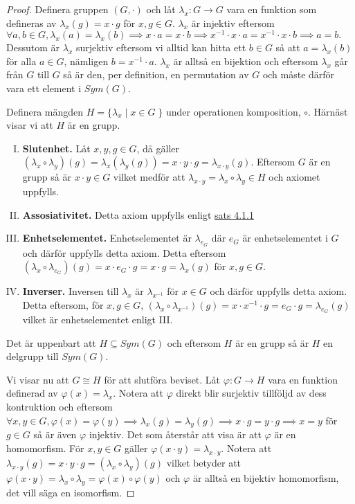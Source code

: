 \documentclass{article}
\theoremstyle{definition}
\begin{document}
\begin{proof}
  Definera gruppen $(G, \cdot)$ och låt $\lambda_x: G \rightarrow G$ vara en funktion som 
  defineras av $\lambda_x (g) = x \cdot g$ för $x, g \in G$. 
  $\lambda_x$ är injektiv eftersom $\forall a, b \in G, \lambda_x(a) = \lambda_x (b) \implies
  x \cdot a = x \cdot b \implies x^{-1} \cdot x \cdot a = x^{-1} \cdot x \cdot b \implies a = b.$
  Dessutom är $\lambda_x$ surjektiv eftersom vi alltid kan hitta ett $b \in G$ så att 
  $a = \lambda_x(b)$ för alla $a \in G$, nämligen $b = x^{-1} \cdot a.$
  $\lambda_x$ är alltså en bijektion och eftersom $\lambda_x$ går från $G$ till $G$ så är 
  den, per definition, en permutation av $G$ och måste därför vara ett element i $Sym(G)$. 

  Definera mängden $H = \{\lambda_x \; |\; x \in G\; \}$ under operationen komposition, $\circ$.
  Härnäst visar vi att $H$ är en grupp.
  \begin{enumerate}[I)]
    \item \textbf{Slutenhet.} Låt $x, y, g \in G$, då gäller
    $(\lambda_x \circ \lambda_y)(g) = \lambda_x(\lambda_y(g)) = x \cdot y \cdot g = 
    \lambda_{x \cdot y}(g).$ Eftersom $G$ är en grupp så är $x \cdot y \in G$ vilket medför 
    att $\lambda_{x \cdot y} = \lambda_x \circ \lambda_y \in H$ och axiomet uppfylls.
    \item \textbf{Assosiativitet.} Detta axiom uppfylls enligt \hyperlink{ass}{sats 4.1.1}
    \item \textbf{Enhetselementet.} Enhetselementet är $\lambda_{e_G}$ där $e_G$ är 
    enhetselementet i $G$ och därför 
    uppfylls detta axiom. Detta eftersom $(\lambda_x \circ \lambda_{e_G})(g) = x \cdot e_G \cdot g
    = x \cdot g = \lambda_x (g)$ för $x, g \in G.$
    \item \textbf{Inverser.} Inversen till $\lambda_x$ är $\lambda_{x^{-1}}$ för $x \in G$
    och därför uppfylls detta axiom. 
    Detta eftersom, för $x, g \in G$, $(\lambda_x \circ \lambda_{x^{-1}})(g) = x \cdot x^{-1} \cdot g = 
    e_G \cdot g = \lambda_{e_G} (g)$ vilket är enhetselementet enligt III.
  \end{enumerate}
  Det är uppenbart att $H \subseteq Sym(G)$ och eftersom $H$ är en grupp så är $H$ en delgrupp 
  till $Sym(G)$. 

  Vi visar nu att $G \cong H$ för att slutföra beviset. Låt $\varphi: G \rightarrow H$ 
  vara en funktion definerad av $\varphi(x) = \lambda_x$. Notera att $\varphi$ direkt 
  blir surjektiv tillföljd av dess kontruktion och eftersom 
  $\forall x, y \in G, \varphi(x) = \varphi(y) \implies \lambda_x (g) = \lambda_y (g)
  \implies x \cdot g = y \cdot g \implies x = y$ för $g \in G$ så är även $\varphi$ injektiv. 
  Det som återstår att visa är att $\varphi$ är en homomorfism. För 
  $x, y \in G$ gäller $\varphi(x \cdot y) = \lambda_{x \cdot y}$. 
  Notera att $\lambda_{x \cdot y} (g) = x \cdot y \cdot g = (\lambda_x \circ \lambda_y)(g)$ 
  vilket betyder att $\varphi(x \cdot y) = \lambda_x \circ \lambda_y = \varphi(x) \circ \varphi(y)$
  och $\varphi$ är alltså en bijektiv homomorfism, det vill säga en isomorfism.
\end{proof}
\end{document}
